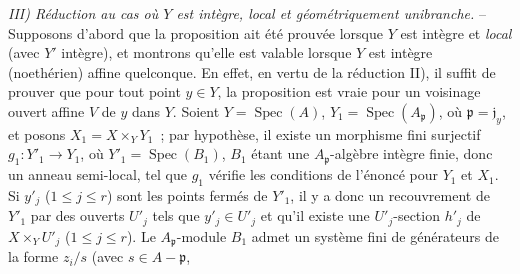 \emph{III) Réduction au cas où $Y$ est intègre, local et géométriquement
unibranche.} -- Supposons d'abord que la proposition ait été prouvée lorsque $Y$
est intègre et \emph{local} (avec $Y'$ intègre), et montrons qu'elle est valable
lorsque $Y$ est intègre (noethérien) affine quelconque. En effet, en vertu de la
réduction II), il suffit de prouver que pour tout point $y\in Y$, la proposition est
vraie pour un voisinage ouvert affine $V$ de $y$ dans $Y$. Soient $Y=\operatorname{Spec}(A)$,
$Y_1=\operatorname{Spec}(A_{\mathfrak p})$, où $\mathfrak p=\mathfrak j_y$, et posons
$X_1=X\times_Y Y_1$~; par hypothèse, il existe un morphisme fini surjectif
$g_1:Y'_1\to Y_1$, où $Y'_1=\operatorname{Spec}(B_1)$, $B_1$ étant une
$A_{\mathfrak p}$-algèbre intègre finie, donc un anneau semi-local, tel que $g_1$
vérifie les conditions de l'énoncé pour $Y_1$ et $X_1$. Si $y'_j$
($1\leq j\leq r$) sont les points fermés de $Y'_1$, il y a donc un recouvrement de
$Y'_1$ par des ouverts $U'_j$ tels que $y'_j\in U'_j$ et qu'il existe une
$U'_j$-section $h'_j$ de $X\times_Y U'_j$ ($1\leq j\leq r$). Le
$A_{\mathfrak p}$-module $B_1$ admet un système fini de générateurs de la forme
$z_i/s$ (avec $s\in A-\mathfrak p$,

